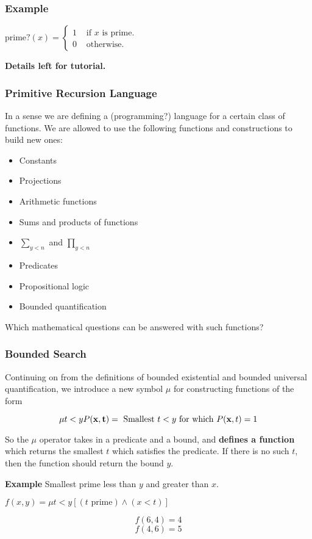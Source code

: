 \documentclass{beamer}
\theoremstyle{indentDefn} \newtheorem{defn}[]{Definition}
\begin{document}
\begin{frame}
	\frametitle{Example}

	 $\text{prime?}(x) = \begin{cases}
		1 & \text{ if } x \text{ is prime.} \\
		0 & \text{ otherwise.}
	 \end{cases}$
	
	\vspace{6cm}

	\hspace{6cm} {\bf Details left for tutorial.}

\end{frame}

\begin{frame}
	\frametitle{Primitive Recursion Language}

	In a sense we are defining a (programming?) language for a certain class of functions. We are allowed to use the following functions and constructions to build new ones: 

	\vspace{0.5cm}

	\begin{itemize}
		\item[] Constants
		\item[] Projections 
		\item[] Arithmetic functions 
		\item[] Sums and products of functions
		\item[] $\sum_{y<n}$ and $\prod_{y<n}$
		\item[] Predicates 
		\item[] Propositional logic 
		\item[] Bounded quantification
	\end{itemize}

	\vspace{0.5cm}

	Which mathematical questions can be answered with such functions? 

\end{frame}

\begin{frame}
	\frametitle{Bounded Search}

	Continuing on from the definitions of bounded existential and bounded universal quantification, we introduce a new symbol $\mu$ for constructing functions of the form 

	$$\mu t < y P({\bf x,t}) = \text{ Smallest } t < y \text{ for which } P({\bf x},t) =1 $$ 

	So the $\mu$ operator takes in a predicate and a bound, and {\bf defines a function} which returns the smallest $t$ which satisfies the predicate. If there is no such $t$, then the function should return the bound $y$. 

	\vspace{0.5cm}

	{\bf Example} Smallest prime less than $y$ and greater than $x$. 

	$f(x,y) = \mu t < y [(t \text{ prime}) \land (x < t)]$

	$$f(6,4) = 4$$ 
	$$f(4,6) = 5$$

\end{frame}
\end{document}
